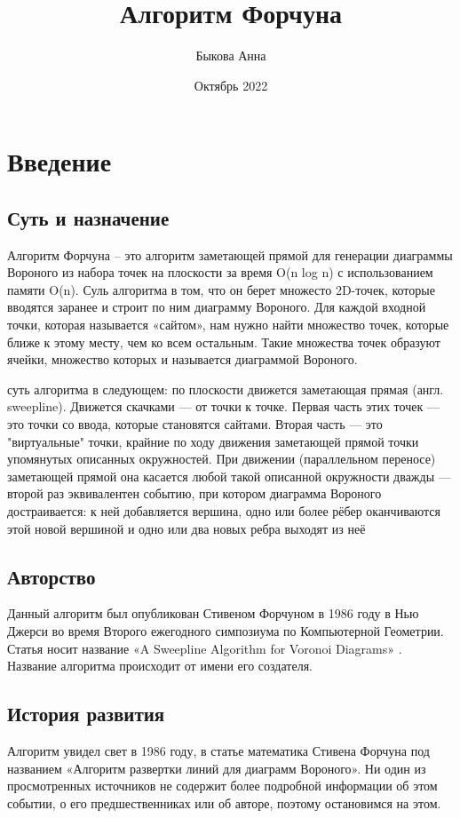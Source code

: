 \documentclass[12 pt, a4paper]{article}
\title{Алгоритм Форчуна}
\author{Быкова Анна}
\date{Октябрь 2022}
\begin{document}
\maketitle

\section{Введение}
\subsection{Суть и назначение}
Алгоритм Форчуна – это алгоритм заметающей прямой для генерации диаграммы Вороного из набора точек на плоскости за время O(n log n) с использованием памяти O(n). Суль алгоритма в том, что он берет множесто 2D-точек, которые вводятся заранее и строит по ним диаграмму Вороного. Для каждой входной точки, которая называется «сайтом», нам нужно найти множество точек, которые ближе к этому месту, чем ко всем остальным. Такие множества точек образуют ячейки, множество которых и называется диаграммой Вороного.

суть алгоритма в следующем: по плоскости движется заметающая прямая (англ. sweepline). Движется скачками — от точки к точке. Первая часть этих точек — это точки со ввода, которые становятся сайтами. Вторая часть — это "виртуальные" точки, крайние по ходу движения заметающей прямой точки упомянутых описанных окружностей. При движении (параллельном переносе) заметающей прямой она касается любой такой описанной окружности дважды — второй раз эквивалентен событию, при котором диаграмма Вороного достраивается: к ней добавляется вершина, одно или более рёбер оканчиваются этой новой вершиной и одно или два новых ребра выходят из неё
\subsection{Авторство}
Данный алгоритм был опубликован Стивеном Форчуном в 1986 году в Нью Джерси во время Второго ежегодного симпозиума по Компьютерной Геометрии. Статья носит название «A Sweepline Algorithm for Voronoi Diagrams» . Название алгоритма происходит от имени его создателя.
\subsection{История развития}
Алгоритм увидел свет в 1986 году, в статье математика Стивена Форчуна под названием «Алгоритм развертки линий для диаграмм Вороного». Ни один из просмотренных источников не содержит более подробной информации об этом событии, о его предшественниках или об авторе, поэтому остановимся на этом.
\end{document}

